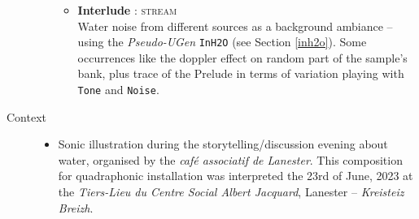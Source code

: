 \begin{description}
\begin{itemize}
\begin{itemize}[leftmargin=0.4in]
		\item \textbf{Interlude} : \textsc{stream} \\ Water noise from different sources as a background ambiance -- using the \textit{Pseudo-UGen} \texttt{InH2O} (see Section \ref{inh2o}). Some occurrences like the doppler effect on random part of the sample's bank, plus trace of the Prelude in terms of variation playing with \texttt{Tone} and \texttt{Noise}.
		\end{itemize}
	\end{itemize}

\item[Context] \hfill 
	\begin{itemize}
	\item[] Sonic illustration during the storytelling/discussion evening about water, organised by the \textit{café associatif de Lanester}. This composition for quadraphonic installation was interpreted the 23rd of June, 2023 at the \textit{Tiers-Lieu du Centre Social Albert Jacquard}, Lanester -- \textit{Kreisteiz Breizh}.
	\end{itemize}


\end{description}

